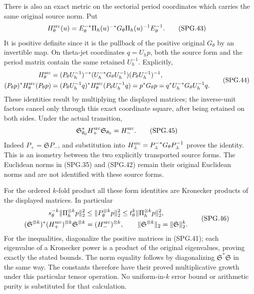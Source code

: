 There is also an exact metric on the sectorial period coordinates
which carries the same original source norm. Put
\[
 H_\theta^{\rm src}(u)
       =E_\theta^{-*}\Pi_h(u)^{-*}G_\theta
                                   \Pi_h(u)^{-1}E_\theta^{-1}.
 \tag{SPG.43}\label{GraphV2:eq:spg-source-period-metric}
\]
It is positive definite since it is the pullback of the positive
original \(G_\theta\) by an invertible map. On theta-jet
coordinates \(q=U_hp\), both the source form and the period
matrix contain the same retained \(U_h^{-1}\). Explicitly,
\[
 \begin{split}
 H_\theta^{\rm src}
   &=(P_\theta U_h^{-1})^{-*}
       (U_h^{-*}G_\theta U_h^{-1})
                           (P_\theta U_h^{-1})^{-1},\\
 (P_\theta p)^*H_\theta^{\rm src}(P_\theta p)
   &=(P_\theta U_h^{-1}q)^*H_\theta^{\rm src}
                         (P_\theta U_h^{-1}q)
     =p^*G_\theta p=q^*U_h^{-*}G_\theta U_h^{-1}q.
 \end{split}
 \tag{SPG.44}\label{GraphV2:eq:spg-source-isometry}
\]
These identities result by multiplying the displayed matrices; the
inverse-unit factors cancel only through this exact coordinate
square, after being retained on both sides. Under the actual
transition,
\[
 \mathfrak S_{\theta_0}^*H_+^{\rm src}
                         \mathfrak S_{\theta_0}=H_-^{\rm src}.
 \tag{SPG.45}\label{GraphV2:eq:spg-transition-source-metric}
\]
Indeed \(P_+=\mathfrak S P_-\), and substitution into
\(H_\pm^{\rm src}=P_\pm^{-*}G_\theta P_\pm^{-1}\) proves the
identity. This is an isometry between the two explicitly transported
source forms. The Euclidean norms in (SPG.35) and (SPG.42) remain
their original Euclidean norms and are not identified with these
source forms.

For the ordered \(k\)-fold product all these form identities are
Kronecker products of the displayed matrices. In particular
\[
 \begin{gathered}
 s_\theta^{-k}\|\Pi_h^{\otimes k}p\|_2^2
   \le\|P_\theta^{\otimes k}p\|_2^2
   \le t_\theta^k\|\Pi_h^{\otimes k}p\|_2^2,\\
 (\mathfrak S^{\otimes k})^*(H_+^{\rm src})^{\otimes k}
         \mathfrak S^{\otimes k}=(H_-^{\rm src})^{\otimes k},
 \qquad
 \|\mathfrak S^{\otimes k}\|_2=\|\mathfrak S\|_2^k.
 \end{gathered}
 \tag{SPG.46}\label{GraphV2:eq:spg-tensor-metric}
\]
For the inequalities, diagonalize the positive matrices in
(SPG.41); each eigenvalue of a Kronecker power is a product of
the original eigenvalues, proving exactly the stated bounds.
The norm equality follows by diagonalizing \(\mathfrak S^*
\mathfrak S\) in the same way. The constants therefore have
their proved multiplicative growth under this particular tensor
operation. No uniform-in-\(k\) error bound or arithmetic purity
is substituted for that calculation.
